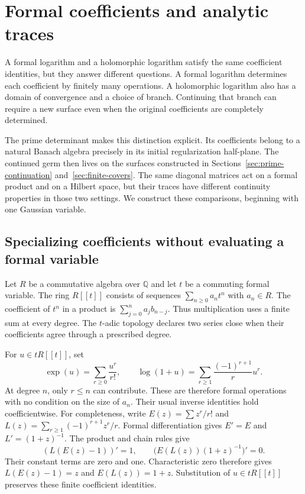 \section{Formal coefficients and analytic traces}
\label{chap:formal-analytic-determinants}

A formal logarithm and a holomorphic logarithm satisfy the same
coefficient identities, but they answer different questions. A formal
logarithm determines each coefficient by finitely many operations.
A holomorphic logarithm also has a domain of convergence and a choice
of branch. Continuing that branch can require a new surface even when
the original coefficients are completely determined.

The prime determinant makes this distinction explicit. Its coefficients
belong to a natural Banach algebra precisely in its initial
regularization half-plane. The continued germ then lives on the surfaces
constructed in Sections~\ref{sec:prime-continuation} and~\ref{sec:finite-covers}. The same
diagonal matrices act on a formal product and on a Hilbert space, but
their traces have different continuity properties in those two settings.
We construct these comparisons, beginning with one Gaussian variable.

\subsection{Specializing coefficients without evaluating a formal variable}
\label{sec:da-specialization}

Let $R$ be a commutative algebra over $\mathbb Q$ and let $t$ be a
commuting formal variable. The ring $R[[t]]$ consists of sequences
$\sum_{n\geq0}a_nt^n$ with $a_n\in R$. The coefficient of $t^n$ in
a product is $\sum_{j=0}^na_jb_{n-j}$. Thus multiplication uses a finite
sum at every degree. The $t$-adic topology declares two series close
when their coefficients agree through a prescribed degree.

For $u\in tR[[t]]$, set
\[
 \exp(u)=\sum_{r\geq0}\frac{u^r}{r!},\qquad
 \log(1+u)=\sum_{r\geq1}\frac{(-1)^{r+1}}r u^r.
\]
At degree $n$, only $r\leq n$ can contribute. These are therefore
formal operations with no condition on the size of $a_n$.
Their usual inverse identities hold coefficientwise. For completeness,
write $E(z)=\sum z^r/r!$ and $L(z)=\sum_{r\geq1}(-1)^{r+1}z^r/r$.
Formal differentiation gives $E'=E$ and $L'=(1+z)^{-1}$.
The product and chain rules give
\[
 (L(E(z)-1))'=1,\qquad
 \bigl(E(L(z))(1+z)^{-1}\bigr)'=0.
\]
Their constant terms are zero and one. Characteristic zero therefore
gives $L(E(z)-1)=z$ and $E(L(z))=1+z$.
Substitution of $u\in tR[[t]]$ preserves these finite coefficient
identities.

